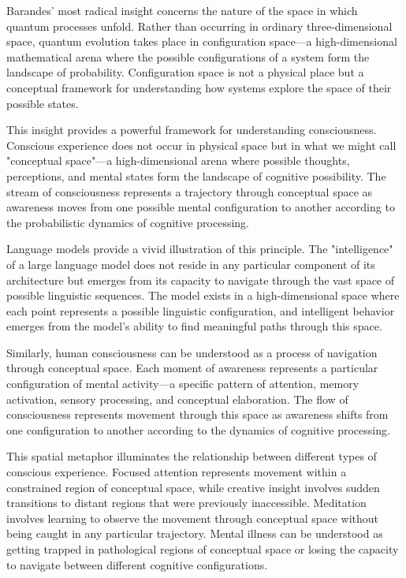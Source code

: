 Barandes' most radical insight concerns the nature of the space in which quantum processes unfold. Rather than occurring in ordinary three-dimensional space, quantum evolution takes place in configuration space—a high-dimensional mathematical arena where the possible configurations of a system form the landscape of probability. Configuration space is not a physical place but a conceptual framework for understanding how systems explore the space of their possible states.

This insight provides a powerful framework for understanding consciousness. Conscious experience does not occur in physical space but in what we might call "conceptual space"—a high-dimensional arena where possible thoughts, perceptions, and mental states form the landscape of cognitive possibility. The stream of consciousness represents a trajectory through conceptual space as awareness moves from one possible mental configuration to another according to the probabilistic dynamics of cognitive processing.

Language models provide a vivid illustration of this principle. The "intelligence" of a large language model does not reside in any particular component of its architecture but emerges from its capacity to navigate through the vast space of possible linguistic sequences. The model exists in a high-dimensional space where each point represents a possible linguistic configuration, and intelligent behavior emerges from the model's ability to find meaningful paths through this space.

Similarly, human consciousness can be understood as a process of navigation through conceptual space. Each moment of awareness represents a particular configuration of mental activity—a specific pattern of attention, memory activation, sensory processing, and conceptual elaboration. The flow of consciousness represents movement through this space as awareness shifts from one configuration to another according to the dynamics of cognitive processing.

This spatial metaphor illuminates the relationship between different types of conscious experience. Focused attention represents movement within a constrained region of conceptual space, while creative insight involves sudden transitions to distant regions that were previously inaccessible. Meditation involves learning to observe the movement through conceptual space without being caught in any particular trajectory. Mental illness can be understood as getting trapped in pathological regions of conceptual space or losing the capacity to navigate between different cognitive configurations.


